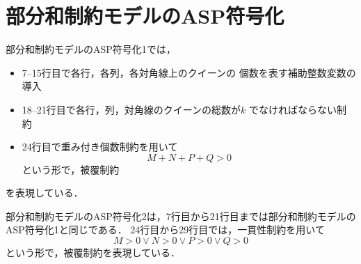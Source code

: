 \newpage
\section{部分和制約モデルのASP符号化}



部分和制約モデルのASP符号化1では，
\begin{itemize}
 \item 7--15行目で各行，各列，各対角線上のクイーンの
個数を表す補助整数変数の導入
 \item 18--21行目で各行，列，対角線のクイーンの総数が$k$
でなければならない制約 
 \item 24行目で重み付き個数制約を用いて
	$$M+N+P+Q>0$$
  という形で，被覆制約
\end{itemize}
を表現している．

\newpage


部分和制約モデルのASP符号化2は，7行目から21行目までは部分和制約モデルのASP符号化1と同じである．
24行目から29行目では，一貫性制約を用いて
$$M>0 \vee N>0 \vee P>0 \vee Q>0$$
という形で，被覆制約を表現している．

